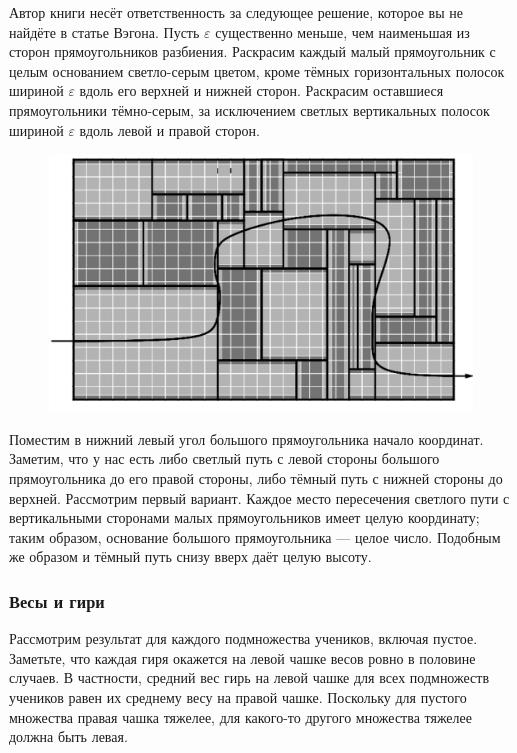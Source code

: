 Автор книги несёт ответственность за следующее решение, которое вы не найдёте в статье Вэгона.
Пусть $\varepsilon$ существенно меньше, чем наименьшая из сторон прямоугольников разбиения.
Раскрасим каждый малый прямоугольник с целым основанием светло-серым цветом, кроме тёмных горизонтальных полосок шириной $\varepsilon$ вдоль его верхней и нижней сторон.
Раскрасим оставшиеся прямоугольники тёмно-серым, за исключением светлых вертикальных полосок шириной $\varepsilon$ вдоль левой и правой сторон.

\begin{figure}[h!]
\centering
\includegraphics[scale=0.5]{Figs/Insight/green}
\end{figure}

Поместим в нижний левый угол большого прямоугольника начало координат.
Заметим, что у нас есть либо светлый путь с левой стороны большого прямоугольника до его правой стороны, либо тёмный путь с нижней стороны до верхней.
Рассмотрим первый вариант.
Каждое место пересечения светлого пути с вертикальными сторонами малых прямоугольников имеет целую координату; таким образом, основание большого прямоугольника --- целое число.
Подобным же образом и тёмный путь снизу вверх даёт целую высоту.

\subsubsection*{Весы и гири} %

Рассмотрим результат для каждого подмножества учеников, включая пустое.
Заметьте, что каждая гиря окажется на левой чашке весов ровно в половине случаев.
В частности, средний вес гирь на левой чашке для всех подмножеств учеников равен их среднему весу на правой чашке.
Поскольку для пустого множества правая чашка тяжелее, 
для какого-то другого множества тяжелее должна быть левая.\heart

